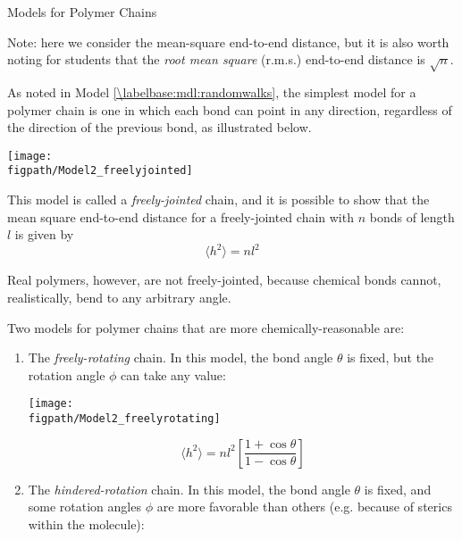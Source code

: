 \begin{activity}{Models for Polymer Chains}
\begin{ctqs}
\begin{enumerate}
\begin{solution}[1.5in]
					Note: here we consider the mean-square end-to-end distance, but it is also worth noting for students that the \emph{root mean square} (r.m.s.) end-to-end distance is $\sqrt{n}$.
				
				\end{solution}
		\end{enumerate}
		

\end{ctqs}

\begin{model}
\label{\labelbase:mdl:chainmodels}

	As noted in Model \ref{\labelbase:mdl:randomwalks}, the simplest model for a polymer chain is one in which each bond can point in any direction, regardless of the direction of the previous bond, as illustrated below.
	
		\centerline{\texttt{[image: \\figpath/Model2\_freelyjointed]}}
	
	This model is called a \emph{freely-jointed} chain, and it is possible to show that the mean square end-to-end distance for a freely-jointed chain with $n$ bonds of length $l$ is given by
	\begin{equation*}
		\langle h^2\rangle =nl^2
	\end{equation*}
	
	Real polymers, however, are not freely-jointed, because chemical bonds cannot, realistically, bend to any arbitrary angle.
	
	Two models for polymer chains that are more chemically-reasonable are:
	
	\begin{enumerate}
		\item The \emph{freely-rotating} chain.  In this model, the bond angle $\theta$ is fixed, but the rotation angle $\phi$ can take any value:
		
			\begin{minipage}[c]{0.45\textwidth}
				\centerline{\texttt{[image: \\figpath/Model2\_freelyrotating]}}
			\end{minipage}\begin{minipage}[c]{0.45\textwidth}
				\begin{equation*}
					\langle h^2\rangle = n l^2 \left[\frac{1+\cos\theta}{1-\cos\theta}\right]
				\end{equation*}
			\end{minipage}
		
		\item The \emph{hindered-rotation} chain.  In this model, the bond angle $\theta$ is fixed, and some rotation angles $\phi$ are more favorable than others (e.g. because of sterics within the molecule):
		

\end{enumerate}
\end{model}
\end{activity}
